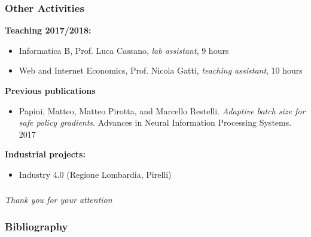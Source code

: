 \documentclass{beamer}
\begin{document}
\begin{frame}
\frametitle{Other Activities}
\textbf{Teaching 2017/2018:}
\begin{itemize}
	\item Informatica B, Prof. Luca Cassano, \textit{lab assistant}, 9 hours
	\item Web and Internet Economics, Prof. Nicola Gatti, \textit{teaching assistant}, 10 hours
\end{itemize}

\vfill

\textbf{Previous publications}
\begin{itemize}
	\item Papini, Matteo, Matteo Pirotta, and Marcello Restelli. \textit{Adaptive batch size for safe policy gradients}. Advances in Neural Information Processing Systems. 2017
\end{itemize}

\vfill

\textbf{Industrial projects:}
\begin{itemize}
	\item Industry 4.0 (Regione Lombardia, Pirelli)
\end{itemize}
\end{frame}

\begin{frame}
\frametitle{}
\centering
\LARGE
\textit{Thank you for your attention}
\end{frame}


\begin{frame}[allowframebreaks]
\frametitle{Bibliography}



\end{frame}

\end{document}

